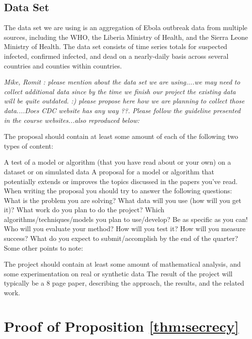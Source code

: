 \documentclass[12pt, journal,onecolumn]{IEEEtran}
\begin{document}
\subsection{Data Set}

The data set we are using \cite{cmriversdata} is an aggregation of Ebola outbreak data from
multiple sources, including the WHO, the Liberia Ministry of Health, and the Sierra Leone Ministry
of Health. The data set consists of time series totals for suspected infected, confirmed infected,
and dead on a nearly-daily basis across several countries and counties within countries.






\bigskip
\bigskip




{\em{Mike, Romit : please mention about the data set we are using....we may need to collect additional data since by the time we finish our project the existing data will be quite outdated. :)  please propose here how we are planning to collect those data....Does CDC website has any way ??. Please follow the guideline presented in the course websites...also reproduced below: }}


 The proposal should contain at least some amount of each of the following two types of content:

A test of a model or algorithm (that you have read about or your own) on a dataset or on simulated data
A proposal for a model or algorithm that potentially extends or improves the topics discussed in the papers you've read.
When writing the proposal you should try to answer the following questions:
What is the problem you are solving?
What data will you use (how will you get it)?
What work do you plan to do the project?
Which algorithms/techniques/models you plan to use/develop? Be as specific as you can!
Who will you evaluate your method? How will you test it? How will you measure success?
What do you expect to submit/accomplish by the end of the quarter?
Some other points to note:

The project should contain at least some amount of mathematical analysis, and some experimentation on real or synthetic data
The result of the project will typically be a 8 page paper, describing the approach, the results, and the related work.

%


\appendices
\section{Proof of Proposition \ref{thm:secrecy}}




\end{document}
